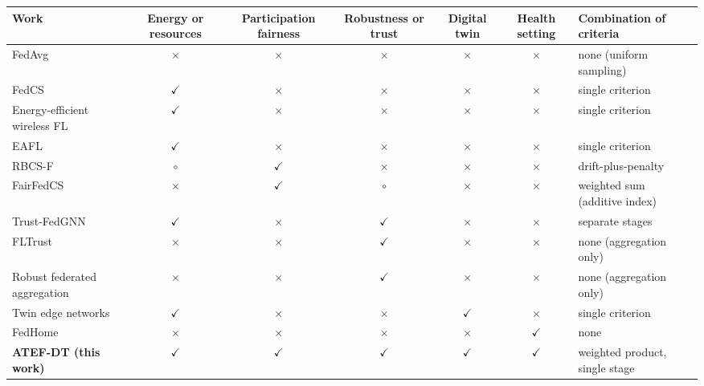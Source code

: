 \begin{table}[t]
	\centering
	\label{tab:comparison}
	\footnotesize
	\setlength{\tabcolsep}{4pt}
	\begin{tabularx}{\textwidth}{>{\raggedright\arraybackslash}X c c c c c >{\raggedright\arraybackslash}p{3.6cm}}
		\toprule
		\textbf{Work} & \textbf{Energy or resources} & \textbf{Participation fairness} & \textbf{Robustness or trust} & \textbf{Digital twin} & \textbf{Health setting} & \textbf{Combination of criteria} \\
		\midrule
		FedAvg~\cite{mcmahan2017communication} & $\times$ & $\times$ & $\times$ & $\times$ & $\times$ & none (uniform sampling) \\
		FedCS~\cite{nishio2019client} & $\checkmark$ & $\times$ & $\times$ & $\times$ & $\times$ & single criterion \\
		Energy-efficient wireless FL~\cite{yang2021energy} & $\checkmark$ & $\times$ & $\times$ & $\times$ & $\times$ & single criterion \\
		EAFL~\cite{arouj2022towards} & $\checkmark$ & $\times$ & $\times$ & $\times$ & $\times$ & single criterion \\
		RBCS-F~\cite{huang2021efficiency} & $\circ$ & $\checkmark$ & $\times$ & $\times$ & $\times$ & drift-plus-penalty \\
		FairFedCS~\cite{shi2023fairfedcs} & $\times$ & $\checkmark$ & $\circ$ & $\times$ & $\times$ & weighted sum (additive index) \\
		Trust-FedGNN~\cite{reis2026trustfedgnn} & $\checkmark$ & $\times$ & $\checkmark$ & $\times$ & $\times$ & separate stages \\
		FLTrust~\cite{cao2021fltrust} & $\times$ & $\times$ & $\checkmark$ & $\times$ & $\times$ & none (aggregation only) \\
		Robust federated aggregation~\cite{pillutla2022robust} & $\times$ & $\times$ & $\checkmark$ & $\times$ & $\times$ & none (aggregation only) \\
		Twin edge networks~\cite{lu2021communication,zhou2025energy} & $\checkmark$ & $\times$ & $\times$ & $\checkmark$ & $\times$ & single criterion \\
		FedHome~\cite{wu2022fedhome} & $\times$ & $\times$ & $\times$ & $\times$ & $\checkmark$ & none \\
		\midrule
		\textbf{ATEF-DT (this work)} & $\checkmark$ & $\checkmark$ & $\checkmark$ & $\checkmark$ & $\checkmark$ & weighted product, single stage \\
		\bottomrule
	\end{tabularx}
\end{table}
